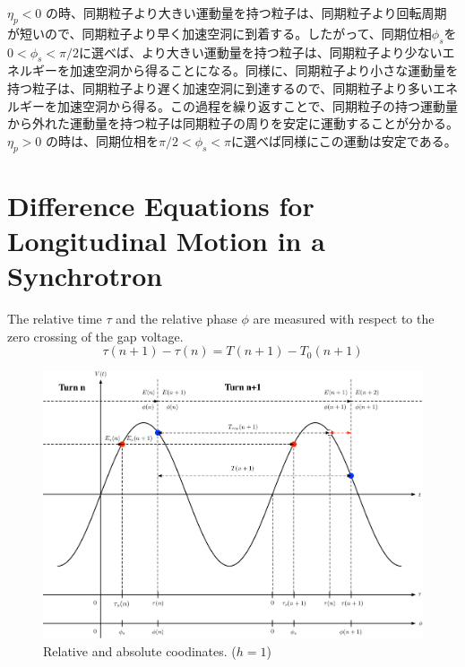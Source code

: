 \documentclass[10pt,a4paper]{ltjsarticle}
\begin{document}
$\eta_p < 0$ の時、同期粒子より大きい運動量を持つ粒子は、同期粒子より回転周期が短いので、同期粒子より早く加速空洞に到着する。したがって、同期位相$\phi_s$を$0<\phi_s<\pi/2$に選べば、より大きい運動量を持つ粒子は、同期粒子より少ないエネルギーを加速空洞から得ることになる。同様に、同期粒子より小さな運動量を持つ粒子は、同期粒子より遅く加速空洞に到達するので、同期粒子より多いエネルギーを加速空洞から得る。この過程を繰り返すことで、同期粒子の持つ運動量から外れた運動量を持つ粒子は同期粒子の周りを安定に運動することが分かる。$\eta_p > 0$ の時は、同期位相を$\pi/2<\phi_s<\pi$に選べば同様にこの運動は安定である。

\section{Difference Equations for Longitudinal Motion in a Synchrotron}
The relative time $\tau$ and the relative phase $\phi$ are measured with respect to the zero crossing of the gap voltage. 
%
\begin{equation}
    \tau(n+1) - \tau(n) = T(n+1) -T_0(n+1)
\end{equation}
%
\begin{figure}[hhbt]
    \begin{center}
      \includegraphics[width=15cm,clip]{figs/coordinates.pdf}
      \caption{Relative and absolute coodinates. ($h=1$)}
      \label{coordinates}
    \end{center}
\end{figure}
\end{document}
